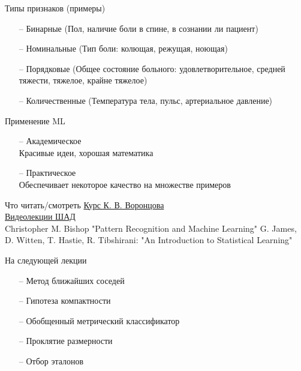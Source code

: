 \documentclass[10pt]{beamer}
\begin{document}
\begin{frame}{Типы признаков (примеры)}
	\begin{itemize}
	  \item[--] Бинарные (Пол, наличие боли в спине, в сознании ли пациент)
	  \item[--] Номинальные (Тип боли: колющая, режущая, ноющая)
	  \item[--] Порядковые (Общее состояние больного: удовлетворительное, средней тяжести, тяжелое, крайне тяжелое)
	  \item[--] Количественные (Температура тела, пульс, артериальное давление)
	\end{itemize}
\end{frame}

\begin{frame}{Применение ML}
	\begin{itemize}
	  \item[--] Академическое\\
	Красивые идеи, хорошая математика
	  \item[--] Практическое\\
	  Обеспечивает некоторое качество на множестве примеров\\
	\end{itemize}
\end{frame}

\begin{frame}{Что читать/смотреть}
  \href{http://www.machinelearning.ru/wiki/images/6/6d/Voron-ML-1.pdf}{Курс К. В. Воронцова}\\
	\href{https://yandexdataschool.ru/edu-process/courses/machine-learning}{Видеолекции ШАД}\\
	Christopher M. Bishop "Pattern Recognition and Machine Learning"
	G. James, D. Witten, T. Hastie, R. Tibshirani: "An Introduction to Statistical Learning" 	
\end{frame}

\begin{frame}{На следующей лекции}
	\begin{itemize}
	  \item[--] Метод ближайших соседей
	  \item[--] Гипотеза компактности
	  \item[--] Обобщенный метрический классификатор
	  \item[--] Проклятие размерности  
	  \item[--] Отбор эталонов     
	\end{itemize}
\end{frame}
\end{document}
